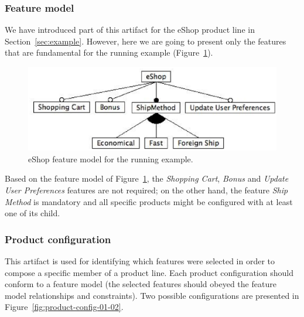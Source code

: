 \documentclass{acm_proc_article-sp}
\begin{document}
\subsubsection{Feature model}

We have introduced part of this artifact for the eShop product line in Section~\ref{sec:example}. However, here we are going to 
present only the features that are fundamental for the running example (Figure~\ref{fig:eshop-fm-re}). 

 \begin{figure}[h]
 \begin{center}
  \includegraphics[scale=0.40]{img/eShop-fm-re.eps}
   \caption{eShop feature model for the running example.}
  \label{fig:eshop-fm-re}
  \end{center}
\end{figure}

Based on the feature model of Figure~\ref{fig:eshop-fm-re}, the \emph{Shopping 
Cart}, \emph{Bonus} and \emph{Update User Preferences} features are not required; on the other hand, the feature \emph{Ship Method} is mandatory and all specific products might be configured with at least one of its child.  

\subsubsection{Product configuration}

This artifact is used for identifying which features were selected in order to compose a specific member of a product line. Each product configuration should conform to a feature model (the selected features should obeyed the feature model relationships and constraints). Two possible configurations are presented in Figure~\ref{fig:product-config-01-02}. 
\end{document}
